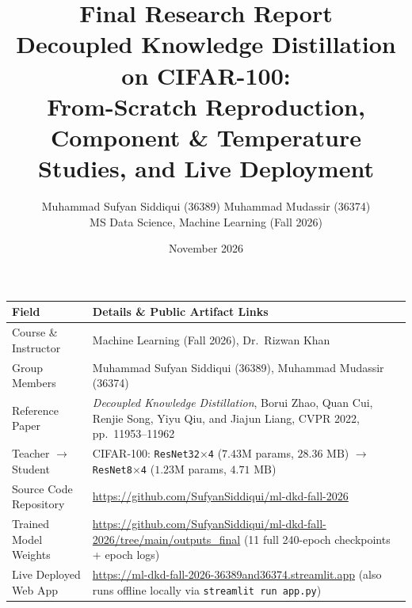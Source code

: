\documentclass[11pt]{article}
\title{\vspace{-1.6em}\textbf{Final Research Report}\\[0.3em]
\large Decoupled Knowledge Distillation on CIFAR-100:\\
From-Scratch Reproduction, Component \& Temperature Studies, and Live Deployment}
\author{Muhammad Sufyan Siddiqui (36389) \quad Muhammad Mudassir (36374)\\[0.25em]
\normalsize MS Data Science, Machine Learning (Fall 2026)}
\date{\vspace{-0.4em}November 2026\vspace{-0.6em}}
\newcommand{\RepoURL}{https://github.com/SufyanSiddiqui/ml-dkd-fall-2026}
\newcommand{\WeightsURL}{https://github.com/SufyanSiddiqui/ml-dkd-fall-2026/tree/main/outputs_final}
\newcommand{\LiveAppURL}{https://ml-dkd-fall-2026-36389and36374.streamlit.app}
\begin{document}
\maketitle

\begin{center}
\small
\begin{tabular}{@{}lp{10.8cm}@{}}
\toprule
\textbf{Field} & \textbf{Details \& Public Artifact Links} \\
\midrule
Course \& Instructor & Machine Learning (Fall 2026), Dr.\ Rizwan Khan \\
Group Members & Muhammad Sufyan Siddiqui (36389), Muhammad Mudassir (36374) \\
Reference Paper & \emph{Decoupled Knowledge Distillation}, Borui Zhao, Quan Cui, Renjie Song, Yiyu Qiu, and Jiajun Liang, CVPR 2022, pp.\ 11953--11962 \cite{zhao2022} \\
Teacher $\rightarrow$ Student & CIFAR-100: \texttt{ResNet32$\times$4} ($7.43\text{M}$ params, $28.36\text{ MB}$) $\rightarrow$ \texttt{ResNet8$\times$4} ($1.23\text{M}$ params, $4.71\text{ MB}$) \\
Source Code Repository & \url{\RepoURL} \\
Trained Model Weights & \url{\WeightsURL} (11 full 240-epoch checkpoints + epoch logs) \\
Live Deployed Web App & \url{\LiveAppURL} (also runs offline locally via \texttt{streamlit run app.py}) \\
\bottomrule
\end{tabular}
\end{center}
\end{document}
